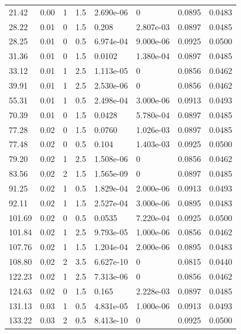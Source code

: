 \documentclass[preview]{standalone}
\begin{document}
{{\begin{tabular}{L{1.2cm}C{1.2cm} C{0.3cm}C{0.5cm} C{1.4cm}C{1.4cm} C{1.4cm}C{1.4cm}}
  21.42  &  0.00  & 1     & 1.5 &  2.690e-06  & 0  & 0.0895 &  0.0483   \\ 
  28.22  &  0.01  & 0     & 1.5 &  0.208  & 2.807e-03  & 0.0897 &  0.0485   \\ 
  28.25  &  0.01  & 0     & 0.5 &  6.974e-04  & 9.000e-06  & 0.0925 &  0.0500   \\ 
  31.36  &  0.01  & 0     & 1.5 &  0.0102  & 1.380e-04  & 0.0897 &  0.0485   \\ 
  33.12  &  0.01  & 1     & 2.5 &  1.113e-05  & 0  & 0.0856 &  0.0462   \\ 
  39.91  &  0.01  & 1     & 2.5 &  2.530e-06  & 0  & 0.0856 &  0.0462   \\ 
  55.31  &  0.01  & 1     & 0.5 &  2.498e-04  & 3.000e-06  & 0.0913 &  0.0493   \\ 
  70.39  &  0.01  & 0     & 1.5 &  0.0428  & 5.780e-04  & 0.0897 &  0.0485   \\ 
  77.28  &  0.02  & 0     & 1.5 &  0.0760  & 1.026e-03  & 0.0897 &  0.0485   \\ 
  77.48  &  0.02  & 0     & 0.5 &  0.104  & 1.403e-03  & 0.0925 &  0.0500   \\ 
  79.20  &  0.02  & 1     & 2.5 &  1.508e-06  & 0  & 0.0856 &  0.0462   \\ 
  83.56  &  0.02  & 2     & 1.5 &  1.565e-09  & 0  & 0.0897 &  0.0485   \\ 
  91.25  &  0.02  & 1     & 0.5 &  1.829e-04  & 2.000e-06  & 0.0913 &  0.0493   \\ 
  92.11  &  0.02  & 1     & 1.5 &  2.527e-04  & 3.000e-06  & 0.0895 &  0.0483   \\ 
  101.69  &  0.02  & 0     & 0.5 &  0.0535  & 7.220e-04  & 0.0925 &  0.0500   \\ 
  101.84  &  0.02  & 1     & 2.5 &  9.793e-05  & 1.000e-06  & 0.0856 &  0.0462   \\ 
  107.76  &  0.02  & 1     & 1.5 &  1.204e-04  & 2.000e-06  & 0.0895 &  0.0483   \\ 
  108.80  &  0.02  & 2     & 3.5 &  6.627e-10  & 0  & 0.0815 &  0.0440   \\ 
  122.23  &  0.02  & 1     & 2.5 &  7.313e-06  & 0  & 0.0856 &  0.0462   \\ 
  124.63  &  0.02  & 0     & 1.5 &  0.165  & 2.228e-03  & 0.0897 &  0.0485   \\ 
  131.13  &  0.03  & 1     & 0.5 &  4.831e-05  & 1.000e-06  & 0.0913 &  0.0493   \\ 
  133.22  &  0.03  & 2     & 0.5 &  8.413e-10  & 0  & 0.0925 &  0.0500   \\ 

\end{tabular}}}
\end{document}
